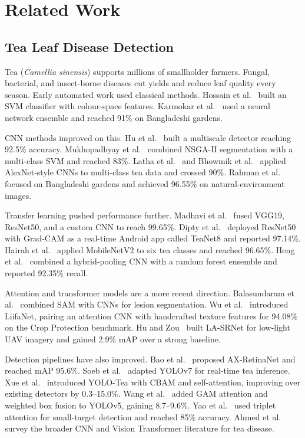 \documentclass[12pt, a4paper, oneside]{Thesis}
\begin{document}
\chapter{Related Work}
\label{sec:related}

\section{Tea Leaf Disease Detection}

Tea (\textit{Camellia sinensis}) supports millions of smallholder farmers. Fungal,
bacterial, and insect-borne diseases cut yields and reduce leaf quality every season.
Early automated work used classical methods. Hossain et al.~\cite{Hossain2018} built
an SVM classifier with colour-space features. Karmokar et al.~\cite{Karmokar2015}
used a neural network ensemble and reached 91\% on Bangladeshi gardens.

CNN methods improved on this. Hu et al.~\cite{HuGensheng2019} built a multiscale
detector reaching 92.5\% accuracy. Mukhopadhyay et al.~\cite{Mukhopadhyay2020}
combined NSGA-II segmentation with a multi-class SVM and reached 83\%. Latha et
al.~\cite{Latha2021} and Bhowmik et al.~\cite{Bhowmik2022} applied AlexNet-style
CNNs to multi-class tea data and crossed 90\%. Rahman et al.~\cite{Rahman2024sci}
focused on Bangladeshi gardens and achieved 96.55\% on natural-environment images.

Transfer learning pushed performance further. Madhavi et al.~\cite{Madhavi2025}
fused VGG19, ResNet50, and a custom CNN to reach 99.65\%. Dipty et
al.~\cite{Dipty2025} deployed ResNet50 with Grad-CAM as a real-time Android app
called TeaNet8 and reported 97.14\%. Hairah et al.~\cite{Hairah2024} applied
MobileNetV2 to six tea classes and reached 96.65\%. Heng et al.~\cite{Heng2024}
combined a hybrid-pooling CNN with a random forest ensemble and reported 92.35\%
recall.

Attention and transformer models are a more recent direction. Balasundaram et
al.~\cite{Balasundaram2024} combined SAM with CNNs for lesion segmentation. Wu et
al.~\cite{Wu2025} introduced LiifaNet, pairing an attention CNN with handcrafted
texture features for 94.08\% on the Crop Protection benchmark. Hu and
Zou~\cite{HuZou2025} built LA-SRNet for low-light UAV imagery and gained 2.9\%
mAP over a strong baseline.

Detection pipelines have also improved. Bao et al.~\cite{Bao2022} proposed
AX-RetinaNet and reached mAP 95.6\%. Soeb et al.~\cite{Soeb2023} adapted
YOLOv7 for real-time tea inference. Xue et al.~\cite{Xue2023} introduced
YOLO-Tea with CBAM and self-attention, improving over existing detectors by
0.3--15.0\%. Wang et al.~\cite{Wang2024forests} added GAM attention and weighted
box fusion to YOLOv5, gaining 8.7--9.6\%. Yao et al.~\cite{Yao2024} used triplet
attention for small-target detection and reached 85\% accuracy. Ahmed et
al.~\cite{Ahmed2023} survey the broader CNN and Vision Transformer literature for
tea disease.
\end{document}
